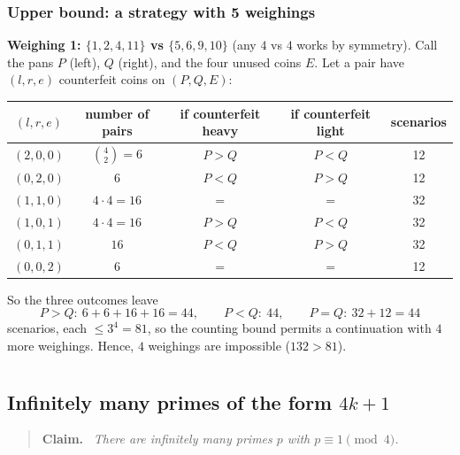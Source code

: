 \documentclass[11pt,a4paper]{article}
\renewcommand{\arraystretch}{1.15}
\newenvironment{claimbox}[1][]{\par\smallskip\begin{quote}\textbf{#1.}\ \itshape}{\end{quote}}
\theoremstyle{definition}
\begin{document}
\subsubsection*{Upper bound: a strategy with 5 weighings}
\textbf{Weighing 1: $\{1,2,4,11\}$ vs $\{5,6,9,10\}$} (any $4$ vs $4$ works by symmetry). Call the pans $P$ (left), $Q$ (right), and the four unused coins $E$. Let a pair have $(l,r,e)$ counterfeit coins on $(P,Q,E)$:

\begin{center}\small
\renewcommand{\arraystretch}{1.2}
\begin{tabular}{@{}ccccc@{}}
\toprule
$(l,r,e)$ & number of pairs & if counterfeit heavy & if counterfeit light & scenarios \\
\midrule
$(2,0,0)$ & $\binom42=6$ & $P>Q$ & $P<Q$ & 12\\
$(0,2,0)$ & $6$ & $P<Q$ & $P>Q$ & 12\\
$(1,1,0)$ & $4\cdot4=16$ & $=$ & $=$ & 32\\
$(1,0,1)$ & $4\cdot4=16$ & $P>Q$ & $P<Q$ & 32\\
$(0,1,1)$ & $16$ & $P<Q$ & $P>Q$ & 32\\
$(0,0,2)$ & $6$ & $=$ & $=$ & 12\\
\bottomrule
\end{tabular}
\end{center}
So the three outcomes leave
\[
P>Q:\ 6+6+16+16=44,\qquad P<Q:\ 44,\qquad P=Q:\ 32+12=44
\]
scenarios, each $\le 3^4=81$, so the counting bound permits a continuation with $4$ more weighings. Hence, $4$ weighings are impossible ($132>81$).








\section{}

\subsection{Infinitely many primes of the form $4k+1$}

\begin{claimbox}[Claim]
There are infinitely many primes $p$ with $p\equiv1\pmod4$.
\end{claimbox}
\end{document}
